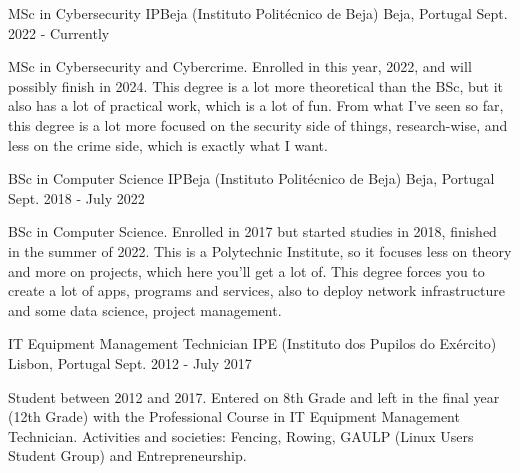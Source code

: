 


\begin{cventries}


  \cventry
  {MSc in Cybersecurity} %
  {IPBeja (Instituto Politécnico de Beja)} %
  {Beja, Portugal} %
  {Sept. 2022 - Currently} %
  { %
    \begin{cvitems}
      \item {MSc in Cybersecurity and Cybercrime. Enrolled in this year, 2022, and will possibly finish in 2024. This degree is a lot more theoretical than the BSc, but it also has a lot of practical work, which is a lot of fun. From what I've seen so far, this degree is a lot more focused on the security side of things, research-wise, and less on the crime side, which is exactly what I want.}
    \end{cvitems}
  }

  \cventry
  {BSc in Computer Science} %
  {IPBeja (Instituto Politécnico de Beja)} %
  {Beja, Portugal} %
  {Sept. 2018 - July 2022} %
  { %
    \begin{cvitems}
      \item {BSc in Computer Science. Enrolled in 2017 but started studies in 2018, finished in the summer of 2022. This is a Polytechnic Institute, so it focuses less on theory and more on projects, which here you'll get a lot of. This degree forces you to create a lot of apps, programs and services, also to deploy network infrastructure and some data science, project management.}
    \end{cvitems}
  }

  \cventry
  {IT Equipment Management Technician} %
  {IPE (Instituto dos Pupilos do Exército)} %
  {Lisbon, Portugal} %
  {Sept. 2012 - July 2017} %
  { %
    \begin{cvitems}
      \item {Student between 2012 and 2017. Entered on 8th Grade and left in the final year (12th Grade) with the Professional Course in IT Equipment Management Technician. Activities and societies: Fencing, Rowing, GAULP (Linux Users Student Group) and Entrepreneurship.}
    \end{cvitems}
  }


\end{cventries}
